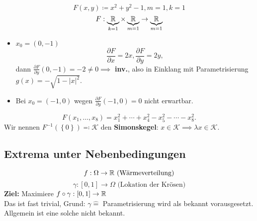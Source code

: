 \begin{example}
	\[
		F(x, y) \coloneqq x^2 + y^2 - 1, m = 1, k = 1
	\]
	\[
		F : \underbrace{\mathbb{R} }_{k = 1}\times \underbrace{\mathbb{R} }_{m = 1}\to \underbrace{\mathbb{R} }_{m = 1}
	\]
	\begin{itemize}
		\item $ x_0 = \left( 0, -1 \right)  $ 
			\[
				\frac{ \partial F }{ \partial x } = 2x,
				\frac{ \partial F }{ \partial y } = 2y,
			\]
			dann $ \frac{ \partial F }{ \partial y } (0, -1) = -2 \neq 0 \implies  $ \textbf{inv.}, also in Einklang mit Parametrisierung $ g(x) = - \sqrt{1 - \left| x \right| ^2}  $.
		\item 
			Bei $ x_0 = \left( -1, 0 \right)  $ wegen $ \frac{ \partial F }{ \partial y } (-1, 0) = 0 $ nicht erwartbar.
	\end{itemize}
\end{example}

\begin{example}
	\[
		F(x_1, \dotsc, x_8) = x_1^2 + \dotsb + x_4^2 - x_5^2 - \dotsb - x_8^2.
	\]
	Wir nennen $ F^{-1} \left( \left\{ 0 \right\}  \right) \eqcolon \mathcal{K}  $ den \textbf{Simonskegel}:
	$ x \in \mathcal{K} \implies \lambda x \in \mathcal{K}  $.
\end{example}

\subsection*{Extrema unter Nebenbedingungen}
\[
	f : \Omega \to \mathbb{R} \text{ (Wärmeverteilung)} 
\]
{
	\color{gadse-dark-blue}
	\[
		\gamma : [0, 1] \to \Omega \text{ (Lokation der Krösen)} 
	\]
}
\textbf{Ziel:} Maximiere $ f \circ \gamma : [0, 1] \to \mathbb{R}  $\\
Das ist fast trivial, Grund: $ \gamma \hat{=}  $ Parametrisierung wird als bekannt vorausgesetzt.
Allgemein ist eine solche nicht bekannt.

